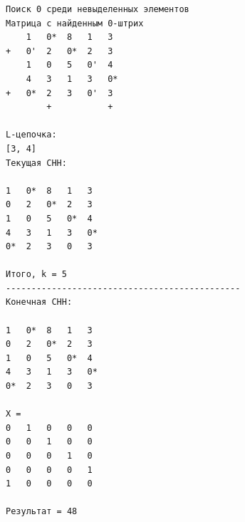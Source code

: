 \documentclass[a4paper,12pt, unknownkeysallowed]{extreport}
\begin{document}
\begin{verbatim}
Поиск 0 среди невыделенных элементов
Матрица с найденным 0-штрих
    1   0*  8   1   3
+   0'  2   0*  2   3
    1   0   5   0'  4
    4   3   1   3   0*
+   0*  2   3   0'  3
        +           +

L-цепочка: 
[3, 4]
Текущая СНН:

1   0*  8   1   3
0   2   0*  2   3
1   0   5   0*  4
4   3   1   3   0*
0*  2   3   0   3

Итого, k = 5
----------------------------------------------
Конечная СНН:

1   0*  8   1   3
0   2   0*  2   3
1   0   5   0*  4
4   3   1   3   0*
0*  2   3   0   3

X =
0   1   0   0   0
0   0   1   0   0
0   0   0   1   0
0   0   0   0   1
1   0   0   0   0

Результат = 48
\end{verbatim}
\end{document}
